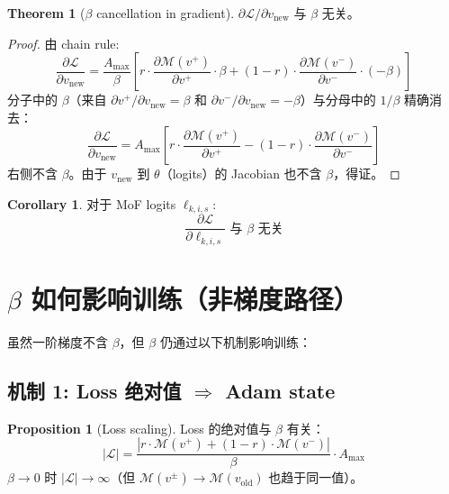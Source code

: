 \documentclass[11pt,a4paper]{article}
\newcommand{\loss}{\mathcal{L}}
\theoremstyle{definition}
\newtheorem{proposition}{Proposition}
\newtheorem{corollary}{Corollary}
\newtheorem{theorem}{Theorem}
\begin{document}
\begin{theorem}[$\beta$ cancellation in gradient]
\label{thm:cancel}
$\partial\loss/\partial v_{\text{new}}$ 与 $\beta$ 无关。
\end{theorem}

\begin{proof}
由 chain rule:
\begin{equation}
\frac{\partial\loss}{\partial v_{\text{new}}} = \frac{A_{\max}}{\beta}\left[r \cdot \frac{\partial\mathcal{M}(v^+)}{\partial v^+}\cdot\beta + (1-r)\cdot\frac{\partial\mathcal{M}(v^-)}{\partial v^-}\cdot(-\beta)\right]
\end{equation}
分子中的 $\beta$（来自 $\partial v^+/\partial v_{\text{new}} = \beta$ 和 $\partial v^-/\partial v_{\text{new}} = -\beta$）与分母中的 $1/\beta$ 精确消去：
\begin{equation}
\frac{\partial\loss}{\partial v_{\text{new}}} = A_{\max}\left[r \cdot \frac{\partial\mathcal{M}(v^+)}{\partial v^+} - (1-r)\cdot\frac{\partial\mathcal{M}(v^-)}{\partial v^-}\right]
\end{equation}
右侧不含 $\beta$。由于 $v_{\text{new}}$ 到 $\theta$（logits）的 Jacobian 也不含 $\beta$，得证。
\end{proof}

\begin{corollary}
对于 MoF logits $\ell_{k,i,s}$:
\begin{equation}
\frac{\partial\loss}{\partial\ell_{k,i,s}} \text{ 与 $\beta$ 无关}
\end{equation}
\end{corollary}

\section{$\beta$ 如何影响训练（非梯度路径）}
\label{sec:beta_effects}

虽然一阶梯度不含 $\beta$，但 $\beta$ 仍通过以下机制影响训练：

\subsection{机制 1: Loss 绝对值 $\Rightarrow$ Adam state}

\begin{proposition}[Loss scaling]
Loss 的绝对值与 $\beta$ 有关：
\begin{equation}
|\loss| = \frac{|r \cdot \mathcal{M}(v^+) + (1-r)\cdot\mathcal{M}(v^-)|}{\beta} \cdot A_{\max}
\end{equation}
$\beta \to 0$ 时 $|\loss| \to \infty$（但 $\mathcal{M}(v^{\pm}) \to \mathcal{M}(v_{\text{old}})$ 也趋于同一值）。
\end{proposition}
\end{document}

